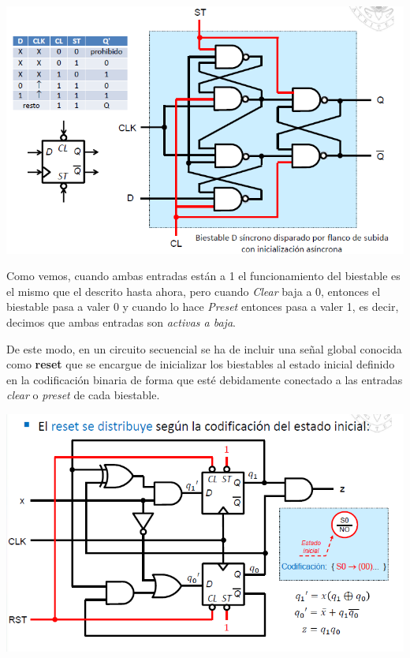 \documentclass[a4paper,10pt]{book}
\begin{document}
\begin{center}
\includegraphics[scale=0.65]{Clear y preset2}
\end{center}

Como vemos, cuando ambas entradas están a 1 el funcionamiento del biestable es el mismo que el descrito hasta ahora, pero cuando \textit{Clear} baja a 0, entonces el biestable pasa a valer 0 y cuando lo hace \textit{Preset} entonces pasa a valer 1, es decir, decimos que ambas entradas son \textit{activas a baja}.

De este modo, en un circuito secuencial se ha de incluir una señal global conocida como \textbf{reset} que se encargue de inicializar los biestables al estado inicial definido en la codificación binaria de forma que esté debidamente conectado a las entradas \textit{clear} o \textit{preset} de cada biestable.

\begin{center}
\includegraphics[scale=0.65]{reset1}
\end{center}
\end{document}
